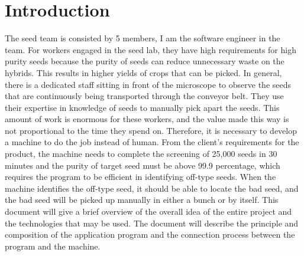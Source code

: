 \documentclass[onecolumn, draftclsnofoot,10pt, compsoc]{IEEEtran}
\begin{document}
\section{Introduction}
The seed team is consisted by 5 members, I am the software engineer in the team. For workers engaged in the seed lab, they have high requirements for high purity seeds because the purity of seeds can reduce unnecessary waste on the hybrids. This results in higher yields of crops that can be picked. In general, there is a dedicated staff sitting in front of the microscope to observe the seeds that are continuously being transported through the conveyor belt. They use their expertise in knowledge of seeds to manually pick apart the seeds. This amount of work is enormous for these workers, and the value made this way is not proportional to the time they spend on. Therefore, it is necessary to develop a machine to do the job instead of human. From the client’s requirements for the product, the machine needs to complete the screening of 25,000 seeds in 30 minutes and the purity of target seed must be above 99.9 percentage, which requires the program to be efficient in identifying off-type seeds. When the machine identifies the off-type seed, it should be able to locate the bad seed, and the bad seed will be picked up manually in either a bunch or by itself. This document will give a brief overview of the overall idea of the entire project and the technologies that may be used. The document will describe the principle and composition of the application program and the connection process between the program and the machine. 
\pagebreak
\end{document}
